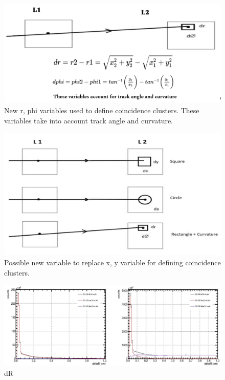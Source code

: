 \begin{figure}[!htp]
\centering
\includegraphics[width=1\textwidth]{ashish_thesis/dr_dphi_variables.png}
\caption{%
  New r, phi variables used to define coincidence clusters. These variables take into account track angle and curvature.
}
\label{fig:drdphi_diagram}
\end{figure}


\begin{figure}[!htp]
\centering
\includegraphics[width=1\textwidth]{ashish_thesis/new_variables.png}
\caption{%
   Possible new variable to replace x, y variable for defining coincidence clusters.
}
\label{fig:newvar}
\end{figure}


\begin{figure}[!htp]
\centering
\includegraphics[width=1\textwidth]{ashish_thesis/deltaR.png}
\caption{%
 dR
}
\label{fig:dR}
\end{figure}


